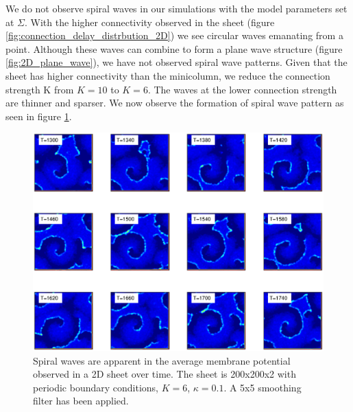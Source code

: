 We do not observe spiral waves in our simulations with the model parameters set at $\Sigma$.
With the higher connectivity observed in the sheet (figure \ref{fig:connection_delay_distrbution_2D}) we see circular waves emanating from a point.
Although these waves can combine to form a plane wave structure (figure \ref{fig:2D_plane_wave}), we have not observed spiral wave patterns.
Given that the sheet has higher connectivity than the minicolumn, we reduce the connection strength K from $K=10$ to $K=6$.
The waves at the lower connection strength are thinner and sparser.
We now observe the formation of spiral wave pattern as seen in figure \ref{fig:2DSpiralWaves}.
\begin{figure}[!htb]
 \caption{ Spiral waves are apparent in the average membrane potential observed in a 2D sheet over time. 
           The sheet is 200x200x2 with periodic boundary conditions, $K=6$, $\kappa=0.1$.
           A 5x5 smoothing filter has been applied. }
 \label{fig:2DSpiralWaves}
 \centering
   \includegraphics[width=\textwidth]{fig/SpiralWaves2D_K6_kappa0p1_M4}
\end{figure}
\FloatBarrier

